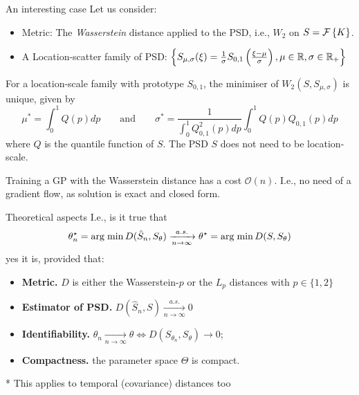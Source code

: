 \documentclass[pdf,aspectratio=169,10pt]{beamer}
\begin{document}
\begin{frame}[plain]{An interesting case}
    Let us consider: 
        \begin{itemize}
        \item Metric: The \textit{Wasserstein} distance applied to the PSD, i.e., $W_2$ on $S=\mathcal{F} \left\{K\right\}$.
        \item A Location-scatter family of PSD: $  \left\{S_{\mu,\sigma}(\xi) = \frac{1}{\sigma} S_{0,1} \left(\frac{\xi-\mu}{\sigma}\right), \mu\in{\mathbb{R}},\sigma\in{\mathbb{R}}_+\right\}$ 
    \end{itemize}
    \begin{theorem} 
\label{thm:convexWF}
For a  location-scale family with prototype $S_{0,1}$, the minimiser of $W_2(S, S_{\mu,\sigma})$ is unique, given by 
\begin{equation}
  \mu^* = \int_0^1 Q(p)d p \qquad \mbox{and} \qquad
  \sigma^* = \frac{1}{\int_0^1 Q_{0,1}^2(p)d p}\int_0^1 Q(p) Q_{0,1}(p)d p \label{eq:soln_mu_sigma}
\end{equation}
where $Q$ is the quantile function of $S$. The PSD $S$ does not need to be location-scale.
\end{theorem}
 Training a GP with the Wasserstein distance has a cost $\mathcal{O}(n)$. I.e., no need of a gradient flow, as solution is exact and closed form.
\end{frame}




\begin{frame}[plain]{Theoretical aspects}
     I.e., is it true that
    \begin{equation}
        \theta_n^\star = \mathop{\rm arg \; min}\limits D(\hat S_n, S_\theta) \xrightarrow[n \to \infty]{a.s.} \theta^\star = \mathop{\rm arg \; min}\limits D(S, S_\theta)
    \end{equation}
    yes it is, provided that: 
    \vspace{1em}
    \begin{itemize}
        \item \textbf{Metric.} $D$ is either the Wasserstein-$p$ or the $L_p$ distances with $p\in\{1,2\}$
        \item \textbf{Estimator of PSD.} $D(\hat S_{n}, S)\xrightarrow [n\to \infty]{a.s.} 0$
        \item \textbf{Identifiability.} $\theta_n\xrightarrow[n\to \infty]{} \theta \iff D(S_{\theta_n}, S_\theta)\to 0$; 
        \item \textbf{Compactness.} the parameter space  $\Theta$ is compact.
    \end{itemize}

    \vspace{2em}
    \flushright ** This applies to temporal (covariance) distances too


\end{frame}
\end{document}
